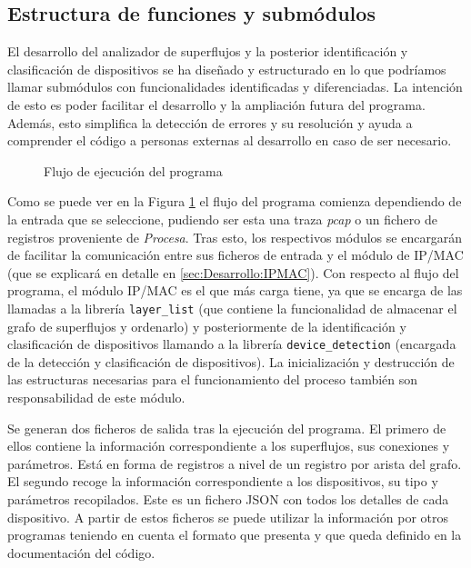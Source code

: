\documentclass[twoside, 12pt]{epstfg}
\begin{document}
\subsection{Estructura de funciones y submódulos}
\label{subsec:Desarrollo:Ordenacion:EstructuraFunciones}
El desarrollo del analizador de superflujos y la posterior identificación y clasificación de dispositivos se ha diseñado y estructurado en lo que podríamos llamar submódulos con funcionalidades identificadas y diferenciadas. La intención de esto es poder facilitar el desarrollo y la ampliación futura del programa. Además, esto simplifica la detección de errores y su resolución y ayuda a comprender el código a personas externas al desarrollo en caso de ser necesario.
\begin{figure}[H]
\centering

\caption[Flujo del programa]{Flujo de ejecución del programa}
\label{fig:Desarrollo:Flujo del programa}
\end{figure}
Como se puede ver en la Figura \ref{fig:Desarrollo:Flujo del programa} el flujo del programa comienza dependiendo de la entrada que se seleccione, pudiendo ser esta una traza \textit{pcap} o un fichero de registros proveniente de \textit{Procesa}. Tras esto, los respectivos módulos se encargarán de facilitar la comunicación entre sus ficheros de entrada y el módulo de IP/MAC (que se explicará en detalle en \ref{sec:Desarrollo:IPMAC}). Con respecto al flujo del programa, el módulo IP/MAC es el que más carga tiene, ya que se encarga de las llamadas a la librería \texttt{layer\_list} (que contiene la funcionalidad de almacenar el grafo de superflujos y ordenarlo) y posteriormente de la identificación y clasificación de dispositivos llamando a la librería \texttt{device\_detection} (encargada de la detección y clasificación de dispositivos). La inicialización y destrucción de las estructuras necesarias para el funcionamiento del proceso también son responsabilidad de este módulo.

Se generan dos ficheros de salida tras la ejecución del programa. El primero de ellos contiene la información correspondiente a los superflujos, sus conexiones y parámetros. Está en forma de registros a nivel de un registro por arista del grafo. El segundo recoge la información correspondiente a los dispositivos, su tipo y parámetros recopilados. Este es un fichero JSON con todos los detalles de cada dispositivo. A partir de estos ficheros se puede utilizar la información por otros programas teniendo en cuenta el formato que presenta y que queda definido en la documentación del código.
\end{document}
